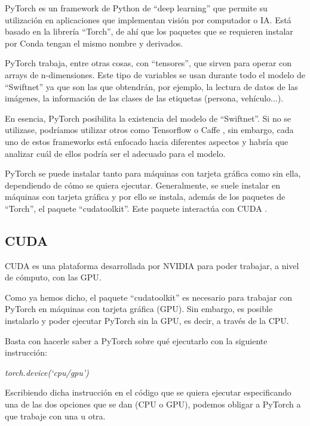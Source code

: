 PyTorch \cite{pytorch} es un framework de Python de ``deep learning'' que permite su utilización en aplicaciones que implementan visión por computador o IA. Está basado en la librería ``Torch'', de ahí que los paquetes que se requieren instalar por Conda tengan el mismo nombre y derivados.

PyTorch trabaja, entre otras cosas, con ``tensores'', que sirven para operar con arrays de n-dimensiones. Este tipo de variables se usan durante todo el modelo de ``Swiftnet'' ya que son las que obtendrán, por ejemplo, la lectura de datos de las imágenes, la información de las clases de las etiquetas (persona, vehículo...).

En esencia, PyTorch posibilita la existencia del modelo de ``Swiftnet''. Si no se utilizase, podríamos utilizar otros como Tensorflow \cite{tensorflow} o Caffe \cite{caffe}, sin embargo, cada uno de estos frameworks está enfocado hacia diferentes aspectos y habría que analizar cuál de ellos podría ser el adecuado para el modelo. 

PyTorch se puede instalar tanto para máquinas con tarjeta gráfica como sin ella, dependiendo de cómo se quiera ejecutar. Generalmente, se suele instalar en máquinas con tarjeta gráfica y por ello se instala, además de los paquetes de ``Torch'', el paquete ``cudatoolkit''. Este paquete interactúa con CUDA \cite {cuda}.

\subsection{CUDA}

CUDA \cite{cuda} es una plataforma desarrollada por NVIDIA para poder trabajar, a nivel de cómputo, con las \ac{GPU}.

Como ya hemos dicho, el paquete ``cudatoolkit'' es necesario para trabajar con PyTorch en máquinas con tarjeta gráfica (\ac{GPU}). Sin embargo, es posible instalarlo y poder ejecutar PyTorch sin la \ac{GPU}, es decir, a través de la \ac{CPU}.

Basta con hacerle saber a PyTorch sobre qué ejecutarlo con la siguiente instrucción:

\begin{center}
\textit{torch.device(`cpu/gpu')}
\end{center}

Escribiendo dicha instrucción en el código que se quiera ejecutar especificando una de las dos opciones que se dan (\ac{CPU} o \ac{GPU}), podemos obligar a PyTorch a que trabaje con una u otra.


